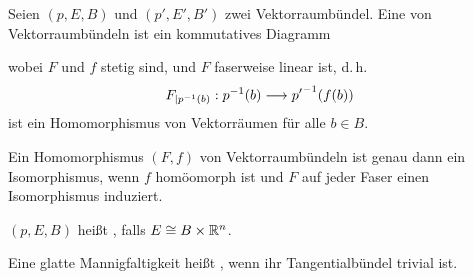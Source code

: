 \Def{}
Seien $(p,E,B)$ und $(p',E',B')$ zwei Vektorraumbündel. Eine  von Vektorraumbündeln ist ein kommutatives Diagramm
\begin{center}
\end{center}
wobei $F$ und $f$ stetig sind, und $F$ faserweise linear ist, d.\,h.
\[ F_{|p^{-1}(b)} : p^{-1}(b) \overset{}{\longrightarrow} {p'}^{-1}(f(b)) \]
ist ein Homomorphismus von Vektorräumen für alle $b\in B$.

\Bem{}
Ein Homomorphismus $(F,f)$ von Vektorraumbündeln ist genau dann ein Isomorphismus, wenn $f$ homöomorph ist und $F$ auf jeder Faser einen Isomorphismus induziert.

\Def{}
$(p,E,B)$ heißt , falls $E \overset{}{\cong} B\times \mathbb{R}^n$.

\Def{}
Eine glatte Mannigfaltigkeit heißt , wenn ihr Tangentialbündel trivial ist.

